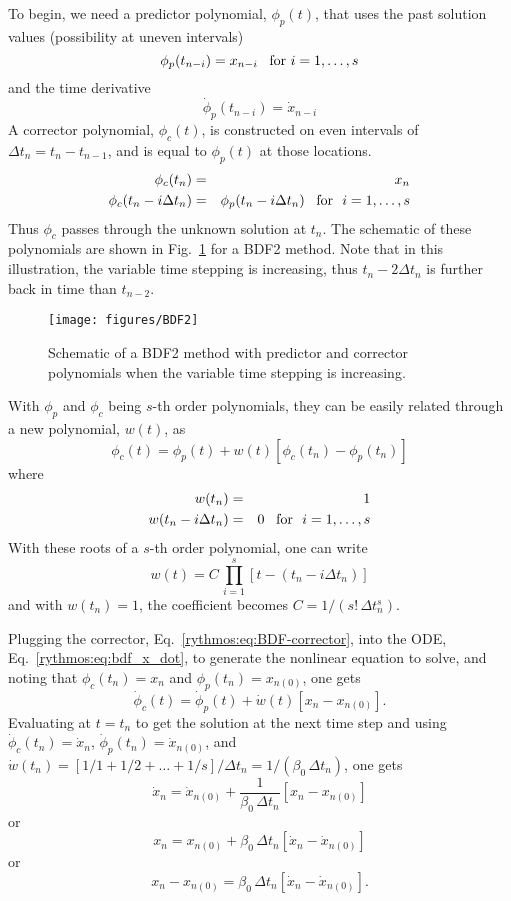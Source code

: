 To begin, we need a predictor polynomial, $\phi_{p}(t)$, that uses
the past solution values (possibility at uneven intervals)
\[
\phi_{p}(t_{n-i})=x_{n-i}\mbox{{\,\,\,\ for\,\,}}i=1,\ldots,s
\]
and the time derivative
\[
\dot{\phi}_{p}(t_{n-i})=\dot{x}_{n-i}
\]
A corrector polynomial, $\phi_{c}(t)$, is constructed on even intervals
of $\Delta t_{n}=t_{n}-t_{n-1}$, and is equal to $\phi_{p}(t)$ at
those locations. 
\begin{eqnarray*}
\phi_{c}(t_{n}) & = & x_{n}\\
\phi_{c}(t_{n}-i\Delta t_{n}) & = & \phi_{p}(t_{n}-i\Delta t_{n})\mbox{{\,\,\,\ for\,\,} }i=1,\ldots,s
\end{eqnarray*}
Thus $\phi_{c}$ passes through the unknown solution at $t_{n}$.
The schematic of these polynomials are shown in Fig.~\ref{rythmos:fig:BDF2-schematic}
for a BDF2 method. Note that in this illustration, the variable time
stepping is increasing, thus $t_{n}-2\Delta t_{n}$ is further back
in time than $t_{n-2}$.

\begin{figure}
\centering{}\texttt{[image: figures/BDF2]}\caption{Schematic of a BDF2 method with predictor and corrector polynomials
when the variable time stepping is increasing.\label{rythmos:fig:BDF2-schematic}}
\end{figure}

With $\phi_{p}$ and $\phi_{c}$ being $s$-th order polynomials,
they can be easily related through a new polynomial, $w(t)$, as
\begin{equation}
\phi_{c}(t)=\phi_{p}(t)+w(t)[\phi_{c}(t_{n})-\phi_{p}(t_{n})]\label{rythmos:eq:BDF-corrector}
\end{equation}
where
\begin{eqnarray*}
w(t_{n}) & = & 1\\
w(t_{n}-i\Delta t_{n}) & = & 0\mbox{{\,\,\,\ for\,\,} }i=1,\ldots,s
\end{eqnarray*}
With these roots of a $s$-th order polynomial, one can write
\[
w(t)=C\,\prod_{i=1}^{s}[t-(t_{n}-i\Delta t_{n})]
\]
and with $w(t_{n})=1$, the coefficient becomes $C=1/(s!\,\Delta t_{n}^{s})$.

Plugging the corrector, Eq.~\ref{rythmos:eq:BDF-corrector}, into
the ODE, Eq.~\ref{rythmos:eq:bdf_x_dot}, to generate the nonlinear
equation to solve, and noting that $\phi_{c}(t_{n})=x_{n}$ and $\phi_{p}(t_{n})=x_{n(0)}$,
one gets
\[
\dot{\phi}_{c}(t)=\dot{\phi}_{p}(t)+\dot{w}(t)[x{}_{n}-x_{n(0)}].
\]
Evaluating at $t=t_{n}$ to get the solution at the next time step
and using $\dot{\phi}_{c}(t_{n})=\dot{x}_{n}$, $\dot{\phi}_{p}(t_{n})=\dot{x}_{n(0)}$,
and $\dot{w}(t_{n})=[1/1+1/2+\ldots+1/s]/\Delta t_{n}=1/(\beta_{0}\,\Delta t_{n})$,
one gets
\[
\dot{x}_{n}=\dot{x}_{n(0)}+\frac{1}{\beta_{0}\,\Delta t_{n}}[x{}_{n}-x_{n(0)}]
\]
or
\[
x_{n}=x_{n(0)}+\beta_{0}\,\Delta t_{n}[\dot{x}_{n}-\dot{x}_{n(0)}]
\]
or
\[
x_{n}-x_{n(0)}=\beta_{0}\,\Delta t_{n}[\dot{x}_{n}-\dot{x}_{n(0)}].
\]

